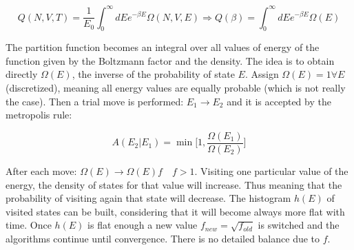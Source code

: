 	$$Q(N, V, T) = \frac{1}{E_0}\int_0^{\infty}dEe^{-\beta E}\Omega(N, V, E)\Rightarrow Q(\beta) = \int_0^{\infty}dEe^{-\beta E}\Omega(E)$$

	The partition function becomes an integral over all values of energy of the function given by the Boltzmann factor and the density.
	The idea is to obtain directly $\Omega(E)$, the inverse of the probability of state $E$.
	Assign $\Omega(E)=1\forall E$ (discretized), meaning all energy values are equally probable (which is not really the case).
	Then a trial move is performed: $E_1\rightarrow E_2$ and it is accepted by the metropolis rule:

	$$A(E_2|E_1) = \min\biggl[1, \frac{\Omega(E_1)}{\Omega(E_2)}\biggr]$$

	After each move: $\Omega(E)\rightarrow \Omega(E)f\quad f>1$.
	Visiting one particular value of the energy, the density of states for that value will increase.
	Thus meaning that the probability of visiting again that state will decrease.
	The histogram $h(E)$ of visited states can be built, considering that it will become always more flat with time.
	Once $h(E)$ is flat enough a new value $f_{new} = \sqrt{f_{old}}$ is switched and the algorithms continue until convergence.
	There is no detailed balance due to $f$.
